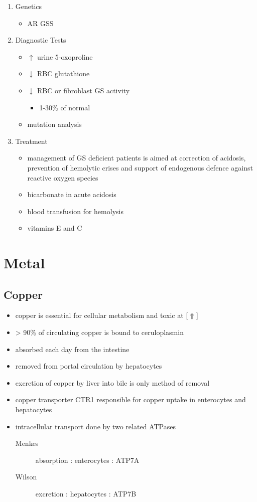 \documentclass[12pt]{scrartcl}
\begin{document}
\begin{enumerate}
\item Genetics
\label{sec:org0ef95d8}
\begin{itemize}
\item AR GSS
\end{itemize}

\item Diagnostic Tests
\label{sec:orga358b37}
\begin{itemize}
\item \(\uparrow\) urine 5-oxoproline
\item \(\downarrow\) RBC glutathione
\item \(\downarrow\) RBC or fibroblast GS activity
\begin{itemize}
\item 1-30\% of normal
\end{itemize}
\item mutation analysis
\end{itemize}

\item Treatment
\label{sec:org0f0c802}
\begin{itemize}
\item management of GS deficient patients is aimed at correction of
acidosis, prevention of hemolytic crises and support of endogenous
defence against reactive oxygen species
\item bicarbonate in acute acidosis
\item blood transfusion for hemolysis
\item vitamins E and C
\end{itemize}
\end{enumerate}
\section{Metal}
\label{sec:org8432999}
\subsection{Copper}
\label{sec:org2c026ae}
\begin{itemize}
\item copper is essential for cellular metabolism and toxic at [\(\Uparrow\)]
\item \textgreater{} 90\% of circulating copper is bound to ceruloplasmin
\item absorbed each day from the intestine
\item removed from portal circulation by hepatocytes
\item excretion of copper by liver into bile is only method of removal
\item copper transporter CTR1 responsible for copper uptake in enterocytes and hepatocytes
\item intracellular transport done by two related ATPases
\begin{description}
\item[{Menkes}] absorption : enterocytes : ATP7A
\item[{Wilson}] excretion : hepatocytes : ATP7B
\end{description}
\end{itemize}
\end{document}
